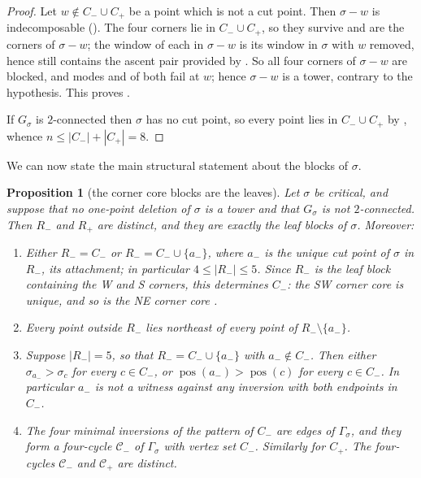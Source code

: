 \documentclass[12pt]{article}
\def\xspace{ }%
\newtheorem{proposition}[proposition]{Proposition}
\theoremstyle{definition}
\newcommand{\cyclem}{\mathcal{C}_-}
\newcommand{\cyclep}{\mathcal{C}_+}
\newcommand{\pos}{\operatorname{pos}}  %
\newcommand{\Wcr}{W\xspace}    %
\newcommand{\Ncr}{N\xspace}    %
\newcommand{\Scr}{S\xspace}    %
\newcommand{\Ecr}{E\xspace}    %
\newcommand{\SWcr}{SW\xspace}  %
\newcommand{\NEcr}{NE\xspace}  %
\newcommand{\core}{corner core\xspace}
\newcommand{\Cm}{C_{-}}
\newcommand{\Cp}{C_{+}}
\newcommand{\Rm}{R_{-}}
\newcommand{\Rp}{R_{+}}
\newcommand{\cgr}{\Gamma}                 %
\newcommand{\igr}{G}                      %
\begin{document}
\begin{proof}
Let $w \notin \Cm \cup \Cp$ be a point which is not a cut point. Then $\sigma - w$ is
indecomposable (). The four corners
lie in $\Cm \cup
\Cp$, so they survive and are the corners of $\sigma - w$; the window of
each in $\sigma - w$ is its window in $\sigma$ with $w$ removed, hence still
contains the ascent pair provided by
. So all four
corners of $\sigma - w$ are blocked, and modes  and
 of  both fail at $w$; hence $\sigma - w$
is a tower, contrary to the hypothesis. This proves .

If $\igr_\sigma$ is $2$-connected then $\sigma$ has no cut point, so
every point lies in $\Cm \cup \Cp$ by , whence
$n \le |\Cm| + |\Cp| = 8$.
\end{proof}

We can now state the main structural statement about the blocks of $\sigma$.

\begin{proposition}[the \core{} blocks are the leaves]\label{prop:leaves}
Let $\sigma$ be critical, and suppose that no one-point deletion of $\sigma$ is
a tower and that $\igr_\sigma$ is not $2$-connected. Then $\Rm$ and $\Rp$ are distinct,
and they are exactly the leaf blocks of $\sigma$. Moreover:
\begin{enumerate}
\item\label{lv:attach} Either $\Rm = \Cm$ or $\Rm = \Cm \cup \{a_-\}$, where
$a_-$ is the unique cut point of $\sigma$ in $\Rm$, its
\emph{attachment}; in particular $4 \le |\Rm| \le 5$. Since $\Rm$ is the
leaf block containing the \Wcr and \Scr corners, this determines $\Cm$:
the \SWcr \core{} is unique, and so is the \NEcr \core.
\item\label{lv:sep} Every point outside $\Rm$ lies northeast of every
point of $\Rm \setminus \{a_-\}$.
\item\label{lv:notwitness} Suppose $|\Rm| = 5$, so that $\Rm = \Cm \cup
\{a_-\}$ with $a_- \notin \Cm$. Then either $\sigma_{a_-} > \sigma_c$ for every
$c \in \Cm$, or $\pos(a_-) > \pos(c)$ for every $c \in \Cm$. In
particular $a_-$ is not a witness against any inversion with both
endpoints in $\Cm$.
\item\label{lv:cycle} The four minimal inversions of the pattern of
$\Cm$ are edges of $\cgr_\sigma$, and they form a four-cycle $\cyclem$
of $\cgr_\sigma$ with vertex set $\Cm$.
Similarly for $\Cp$. The four-cycles $\cyclem$ and $\cyclep$ are distinct.
\end{enumerate}
\end{proposition}
\end{document}
